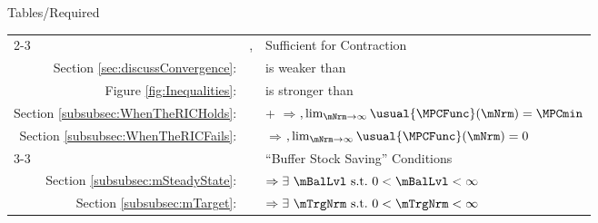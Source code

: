 \documentclass[\econtexRoot/BufferStockTheory]{subfiles}
\providecommand{\TblName}{}
\renewcommand{\TblName}{Required}
\begin{document}
\begin{verbatimwrite}{Tables/\TblName}
\begin{table}
{\begin{tabular}{|l|l|l|}
        \\ \cline{2-3}\multicolumn{1}{|r|}{Section \ref{subsec:contraction}:}                            & \FVAC, \WRIC                      & Sufficient for Contraction
        \\ \multicolumn{1}{|r|}{Section \ref{sec:discussConvergence}:}                               &                      & {\WRIC}{ is} weaker than \RIC 
        \\  \multicolumn{1}{|r|}{Figure \ref{fig:Inequalities}:}                                        &                                 & {\FVAC}{ is} stronger than \PFFVAC 
        \\ \multicolumn{1}{|r|}{Section \ref{subsubsec:WhenTheRICHolds}:}
                                                                                                                               &                                 & \cncl{\FHWC}+{\RIC} $\Rightarrow ${\GICRaw}$, \lim_{\mNrm \rightarrow \infty} \usual{\MPCFunc}(\mNrm)=\MPCmin$
        \\  \multicolumn{1}{|r|}{Section \ref{subsubsec:WhenTheRICFails}:}                                        &                                 & \cncl{\RIC}  $\Rightarrow $\cncl{\FHWC}$, \lim_{\mNrm \rightarrow \infty} \usual{\MPCFunc}(\mNrm)=0$
        \\ \cline{3-3}\multicolumn{1}{|r|}{Section \ref{subsec:onetarget}:}                                        &                                 & ``Buffer Stock Saving'' Conditions
        \\ \multicolumn{1}{|r|}{Section \ref{subsubsec:mSteadyState}:}                                        &                                 & \phantom{-Nrm}{\GICRaw} $\Rightarrow  \exists\phantom{~}\mBalLvl \phantom{~}\text{s.t.}\phantom{~} 0 < \mBalLvl < \infty$ %
        \\ \multicolumn{1}{|r|}{Section \ref{subsubsec:mTarget}:}                                        &                                 & {\GICMod} $\Rightarrow \exists \phantom{~} \mTrgNrm \phantom{~} \text{s.t.}\phantom{~} 0 < \mTrgNrm < \infty$ %
                                                                                                                           

\end{tabular}}
\end{table}
\end{verbatimwrite}
\end{document}
